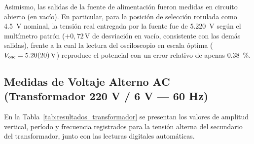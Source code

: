 Asimismo, las salidas de la fuente de alimentación fueron medidas en circuito abierto (en vacío). En particular, para la posición de selección rotulada como \qty{4,5}{\volt} nominal, la tensión real entregada por la fuente fue de \qty{5,220}{\volt} según el multímetro patrón ($+0{,}72\,\text{V}$ de desviación en vacío, consistente con las demás salidas), frente a la cual la lectura del osciloscopio en escala óptima ($V_{\text{osc}} = \qty{5,20 \pm 0,20}{\volt}$) reproduce el potencial con un error relativo de apenas \qty{0,38}{\percent}.

\subsection{Medidas de Voltaje Alterno AC (Transformador 220 V / 6 V — 60 Hz)}
En la Tabla~\ref{tab:resultados_transformador} se presentan los valores de amplitud vertical, período y frecuencia registrados para la tensión alterna del secundario del transformador, junto con las lecturas digitales automáticas.

\begin{table}[H]
    \centering
    \caption{Parámetros experimentales de la señal senoidal del transformador reductor de \qty{6}{\volt} a \qty{60}{\hertz}.}
    \label{tab:resultados_transformador}
\end{table}

